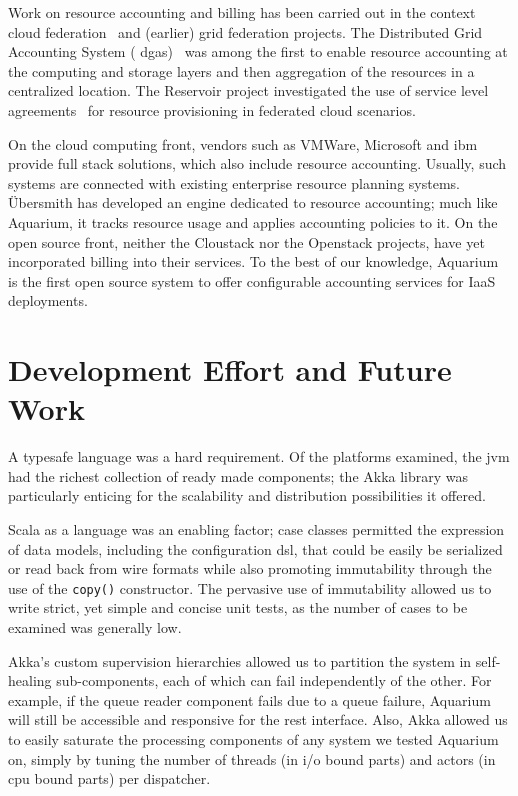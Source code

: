 \documentclass[letterpaper,twocolumn,10pt]{article}
\begin{document}
Work on resource accounting and billing has been carried out in the
context cloud federation~\cite{Rochw09, Elmro09} and (earlier) grid
federation projects. The Distributed Grid Accounting System ({\sc
  dgas})~\cite{Piro06} was among the first to enable resource
accounting at the computing and storage layers and then aggregation of
the resources in a centralized location. The Reservoir project
investigated the use of service level agreements~\cite{Elmro09} for
resource provisioning in federated cloud scenarios.

On the cloud computing front, vendors such as VMWare, Microsoft and
{\sc ibm} provide full stack solutions, which also include resource
accounting. Usually, such systems are connected with existing
enterprise resource planning systems. \"Ubersmith has developed an
engine dedicated to resource accounting; much like Aquarium, it tracks
resource usage and applies accounting policies to it. On the open
source front, neither the Cloustack nor the Openstack projects, have
yet incorporated billing into their services. To the best of our
knowledge, Aquarium is the first open source system to offer
configurable accounting services for IaaS deployments.


\section{Development Effort and Future Work}

A typesafe language was a hard requirement. Of the platforms examined,
the {\sc jvm} had the richest collection of ready made components; the
Akka library was particularly enticing for the scalability and
distribution possibilities it offered.

Scala as a language was an enabling factor; case classes permitted the
expression of data models, including the configuration {\sc dsl}, that
could be easily be serialized or read back from wire formats while
also promoting immutability through the use of the \texttt{copy()}
constructor. The pervasive use of immutability allowed us to write
strict, yet simple and concise unit tests, as the number of cases to
be examined was generally low. 

Akka's custom supervision hierarchies allowed us to partition the
system in self-healing sub-components, each of which can fail
independently of the other. For example, if the queue reader component
fails due to a queue failure, Aquarium will still be accessible and
responsive for the {\sc rest} interface. Also, Akka allowed us to
easily saturate the processing components of any system we tested
Aquarium on, simply by tuning the number of threads (in {\sc i/o}
bound parts) and actors (in {\sc cpu} bound parts) per dispatcher.
\end{document}
